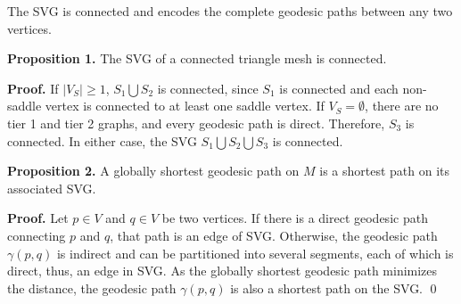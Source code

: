The SVG is connected and encodes the complete geodesic paths between
any two vertices.

\noindent\textbf{Proposition 1.}  The SVG of a connected
triangle mesh is connected.

\noindent\textbf{Proof.} If $|V_S|\geq 1$, $S_1\bigcup S_2$ is
connected, since $S_1$ is connected and each non-saddle vertex is
connected to at least one saddle vertex. If $V_S=\emptyset$, there
are no tier 1 and tier 2 graphs, and every geodesic path is direct.
Therefore, $S_3$ is connected. In either case, the SVG
$S_1\bigcup S_2\bigcup S_3$ is connected.

\noindent\textbf{Proposition 2.} A globally shortest geodesic path on
$M$ is a shortest path on its associated SVG.

\noindent\textbf{Proof.}  Let $p\in V$ and $q\in V$ be two vertices.
If there is a direct geodesic path connecting $p$ and $q$, that path
is an edge of SVG. Otherwise, the geodesic path $\gamma(p,q)$ is
indirect and can be partitioned into several segments, each of which
is direct, thus, an edge in SVG. As the globally shortest geodesic
path minimizes the distance, the geodesic path $\gamma(p,q)$ is also
a shortest path on the SVG. \qed

